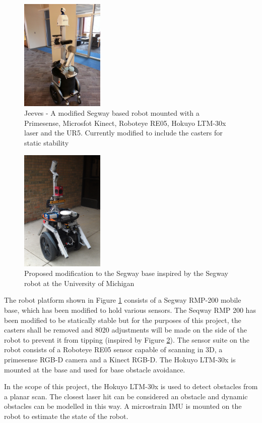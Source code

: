 \documentclass[journal]{IEEEtran}
\begin{document}
\begin{figure}
    \centering
    \includegraphics[width = 4cm, scale=0.2]{jeeves2_0.jpg}
    \caption{Jeeves - A modified Segway based robot mounted with a Primesense, Microsfot Kinect, Roboteye RE05, Hokuyo LTM-30x laser and the UR5. Currently modified to include the casters for static stability}
    \label{fig:jeeves}
\end{figure}

\begin{figure}
    \centering
    \includegraphics[width = 4cm, scale=0.2]{segway1.jpg}
    \caption{Proposed modification to the Segway base inspired by the Segway robot at the University of Michigan}
    \label{fig:mod_jeeves}
\end{figure}

The robot platform shown in Figure \ref{fig:jeeves} consists of a Segway RMP-200 mobile base, which has been
modified to hold various sensors. The Seqway RMP 200 has been modified to be statically stable but for the purposes of this project, the casters shall be removed and 8020 adjustments will be made on the side of the robot to prevent it from tipping (inspired by Figure \ref{fig:mod_jeeves}). The sensor suite on the robot consists of a Roboteye RE05 sensor capable of scanning in 3D, a primesense RGB-D camera and a Kinect RGB-D. The Hokuyo LTM-30x is mounted at the base and used for base obstacle avoidance. 

In the scope of this project, the Hokuyo LTM-30x is used to detect obstacles from a planar scan. The closest laser hit can be considered an obstacle and dynamic obstacles can be modelled in this way. A microstrain IMU is mounted on the robot to estimate the state of the robot.
\end{document}

